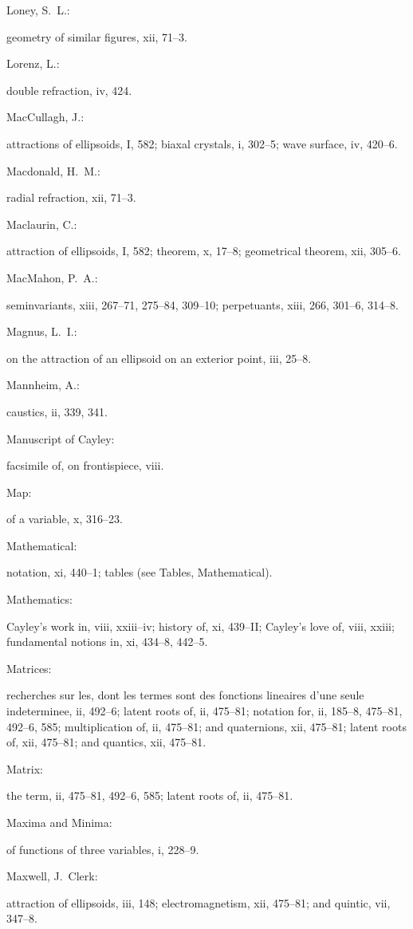 \documentclass[11pt,a4paper]{book}
\providecommand{\V}[1]{#1}
\providecommand{\IndexEntry}[2]{#1\dotfill #2\par}
\begin{document}
\IndexEntry{Loney, S.\ L.}: geometry of similar figures, \V{xii}, 71--3.

\IndexEntry{Lorenz, L.}: double refraction, \V{iv}, 424.

\IndexEntry{MacCullagh, J.}: attractions of ellipsoids, \V{I}, 582; biaxal crystals, \V{i}, 302--5; wave surface, \V{iv}, 420--6.

\IndexEntry{Macdonald, H.\ M.}: radial refraction, \V{xii}, 71--3.

\IndexEntry{Maclaurin, C.}: attraction of ellipsoids, \V{I}, 582; theorem, \V{x}, 17--8; geometrical theorem, \V{xii}, 305--6.

\IndexEntry{MacMahon, P.\ A.}: seminvariants, \V{xiii}, 267--71, 275--84, 309--10; perpetuants, \V{xiii}, 266, 301--6, 314--8.

\IndexEntry{Magnus, L.\ I.}: on the attraction of an ellipsoid on an exterior point, \V{iii}, 25--8.

\IndexEntry{Mannheim, A.}: caustics, \V{ii}, 339, 341.

\newpage

\setcounter{page}{111}

\IndexEntry{Manuscript of Cayley}: facsimile of, on frontispiece, \V{viii}.

\IndexEntry{Map}: of a variable, \V{x}, 316--23.

\IndexEntry{Mathematical}: notation, \V{xi}, 440--1; tables (see Tables, Mathematical).

\IndexEntry{Mathematics}: Cayley's work in, \V{viii}, xxiii--iv; history of, \V{xi}, 439--II; Cayley's love of, \V{viii}, xxiii; fundamental notions in, \V{xi}, 434--8, 442--5.

\IndexEntry{Matrices}: recherches sur les, dont les termes sont des fonctions lineaires d'une seule indeterminee, \V{ii}, 492--6; latent roots of, \V{ii}, 475--81; notation for, \V{ii}, 185--8, 475--81, 492--6, 585; multiplication of, \V{ii}, 475--81; and quaternions, \V{xii}, 475--81; latent roots of, \V{xii}, 475--81; and quantics, \V{xii}, 475--81.

\IndexEntry{Matrix}: the term, \V{ii}, 475--81, 492--6, 585; latent roots of, \V{ii}, 475--81.

\IndexEntry{Maxima and Minima}: of functions of three variables, \V{i}, 228--9.

\IndexEntry{Maxwell, J.\ Clerk}: attraction of ellipsoids, \V{iii}, 148; electromagnetism, \V{xii}, 475--81; and quintic, \V{vii}, 347--8.
\end{document}
